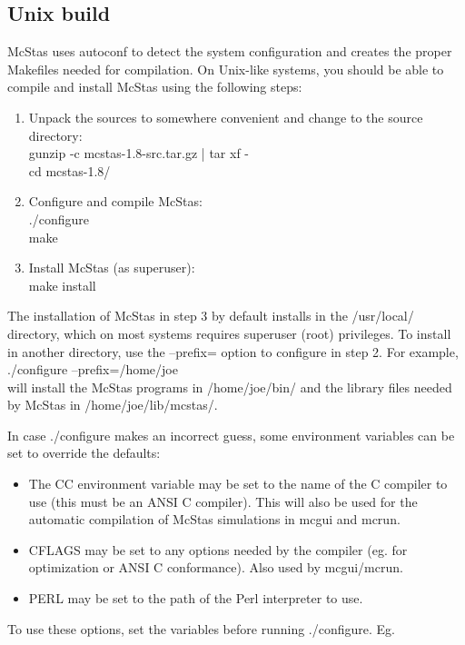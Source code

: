 \subsection{Unix build}

McStas uses autoconf to detect the system configuration and creates the
proper Makefiles needed for compilation. On Unix-like systems, you
should be able to compile and install McStas using the following steps:
\begin{enumerate}
\item{Unpack the sources to somewhere convenient and change to the
    source directory:\\
  gunzip -c mcstas-1.8-src.tar.gz | tar xf -\\
  cd mcstas-1.8/}
\item{Configure and compile McStas:\\
  ./configure\\
  make}
\item{Install McStas (as superuser):\\
  make install}
\end{enumerate}

\noindent The installation of McStas in step 3 by default installs in the
/usr/local/ directory, which on most systems requires superuser (root)
privileges. To install in another directory, use the --prefix= option to
configure in step 2. For example,\\

  ./configure --prefix=/home/joe\\

\noindent will install the McStas programs in /home/joe/bin/ and the
library files needed by McStas in /home/joe/lib/mcstas/.

In case ./configure makes an incorrect guess, some environment variables
can be set to override the defaults:
\begin{itemize}
\item{The CC environment variable may be set to the name of the C compiler
   to use (this must be an ANSI C compiler). This will also be used for
   the automatic compilation of McStas simulations in mcgui and
   mcrun.}
\item{CFLAGS may be set to any options needed by the compiler (eg. for
   optimization or ANSI C conformance). Also used by mcgui/mcrun.}
\item{PERL may be set to the path of the Perl interpreter to use.}
\end{itemize}
\noindent To use these options, set the variables before running ./configure. Eg.\\

